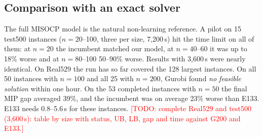 \documentclass[preprint,review,12pt,authoryear]{elsarticle}
\newcommand{\todo}[1]{\textcolor{red}{[TODO: #1]}}
\begin{document}
\begin{table}[t]\centering\small
\caption{Real529 by instance set. UB: mean makespan; $\Delta$: mean gap to BKS (\%); BS/NBS: instances
reaching / improving the BKS; time: mean wall seconds per instance.}
\label{tab:real529}
\end{table}

\subsection{Comparison with an exact solver}\label{sec:exact}
The full MISOCP model is the natural non-learning reference. A pilot on 15 test500 instances
($n=20$--100, three per size, 7{,}200\,s) hit the time limit on all of them: at $n=20$ the incumbent matched our
model, at $n=40$--60 it was up to 18\% worse and at $n=80$--100 50--90\% worse. Results with 3{,}600\,s were
nearly identical. On Real529 the run has so far covered the 128 largest instances.
On all 50 instances with $n=100$ and all 25 with $n=200$, Gurobi found \emph{no feasible solution} within one hour.
On the 53 completed instances with $n=50$ the final MIP gap averaged 39\%, and the incumbent was on average
23\% worse than E133. E133 needs 0.8--5.6\,s for these instances.
\todo{complete Real529 and test500 (3{,}600\,s): table by size with status, UB, LB, gap and time against G200
and E133.}
\end{document}
